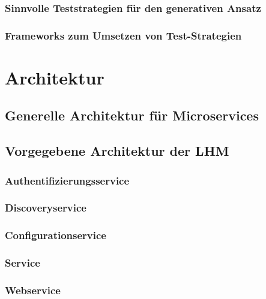 \documentclass[12pt,a4paper,bibliography=totocnumbered,listof=totocnumbered]{scrartcl}
\begin{document}
\subsubsection{Sinnvolle Teststrategien für den generativen Ansatz}

\subsubsection{Frameworks zum Umsetzen von Test-Strategien}

\section{Architektur}

\subsection{Generelle Architektur für Microservices}

\subsection{Vorgegebene Architektur der LHM}

\subsubsection{Authentifizierungsservice}

\subsubsection{Discoveryservice}

\subsubsection{Configurationservice}

\subsubsection{Service}

\subsubsection{Webservice}
\end{document}
